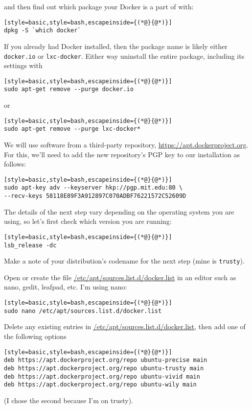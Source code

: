 and then find out which package your Docker is a part of with:
\begin{lstlisting}[style=basic,style=bash,escapeinside={(*@}{@*)}]
dpkg -S `which docker`
\end{lstlisting}

If you already had Docker installed, then the package name is likely either \texttt{docker.io} or \texttt{lxc-docker}. Either way uninstall the entire package, including its settings with
\begin{lstlisting}[style=basic,style=bash,escapeinside={(*@}{@*)}]
sudo apt-get remove --purge docker.io
\end{lstlisting}
or
\begin{lstlisting}[style=basic,style=bash,escapeinside={(*@}{@*)}]
sudo apt-get remove --purge lxc-docker*
\end{lstlisting}

We will use software from a third-party repository, \url{https://apt.dockerproject.org}. For this, we'll need to add the new repository's PGP key to our installation as follows:
\begin{lstlisting}[style=basic,style=bash,escapeinside={(*@}{@*)}]
sudo apt-key adv --keyserver hkp://pgp.mit.edu:80 \
--recv-keys 58118E89F3A912897C070ADBF76221572C52609D
\end{lstlisting}

The details of the next step vary depending on the operating system you are using, so let's first check which version you are running:
\begin{lstlisting}[style=basic,style=bash,escapeinside={(*@}{@*)}]
lsb_release -dc
\end{lstlisting}
Make a note of your distribution's codename for the next step (mine is \texttt{trusty}).

Open or create the file \url{/etc/apt/sources.list.d/docker.list} in an editor such as nano, gedit, leafpad, etc. I'm using nano:
\begin{lstlisting}[style=basic,style=bash,escapeinside={(*@}{@*)}]
sudo nano /etc/apt/sources.list.d/docker.list
\end{lstlisting}

Delete any existing entries in \url{/etc/apt/sources.list.d/docker.list}, then add one of the following options
\begin{lstlisting}[style=basic,style=bash,escapeinside={(*@}{@*)}]
deb https://apt.dockerproject.org/repo ubuntu-precise main
deb https://apt.dockerproject.org/repo ubuntu-trusty main
deb https://apt.dockerproject.org/repo ubuntu-vivid main
deb https://apt.dockerproject.org/repo ubuntu-wily main
\end{lstlisting}
(I chose the second because I'm on trusty).

